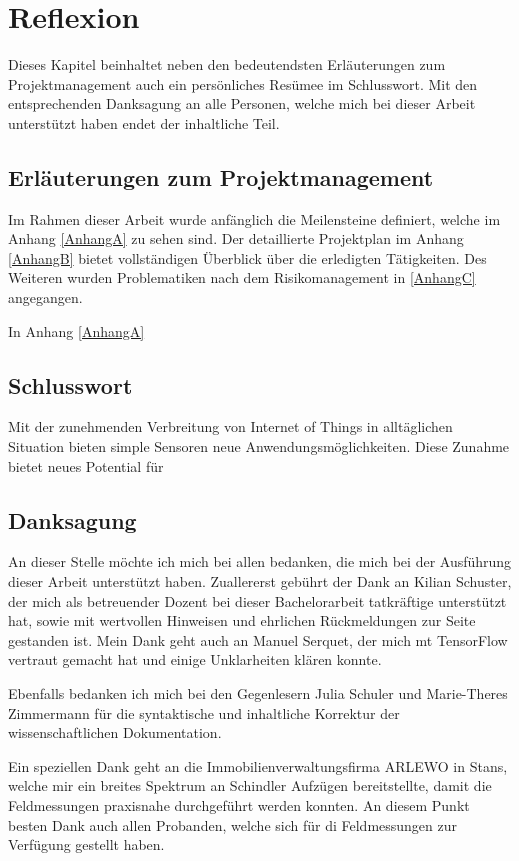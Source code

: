 \chapter{Reflexion}
\label{chap:Reflexion}

Dieses Kapitel beinhaltet neben den bedeutendsten Erläuterungen zum Projektmanagement auch ein persönliches Resümee im Schlusswort. Mit den entsprechenden Danksagung an alle Personen, welche mich bei dieser Arbeit unterstützt haben endet der inhaltliche Teil.


\section{Erläuterungen zum Projektmanagement}
Im Rahmen dieser Arbeit wurde anfänglich die Meilensteine definiert, welche im Anhang \ref{AnhangA} zu sehen sind. Der detaillierte Projektplan im Anhang \ref{AnhangB} bietet vollständigen Überblick über die erledigten Tätigkeiten. Des Weiteren wurden Problematiken nach dem Risikomanagement in \ref{AnhangC} angegangen.

In Anhang \ref{AnhangA}


\section{Schlusswort}

Mit der zunehmenden Verbreitung von Internet of Things in alltäglichen Situation bieten simple Sensoren neue Anwendungsmöglichkeiten. Diese Zunahme bietet neues Potential für 



\section{Danksagung}

An dieser Stelle möchte ich mich bei allen bedanken, die mich bei der Ausführung dieser
Arbeit unterstützt haben. 
Zuallererst gebührt der Dank an Kilian Schuster, der mich als betreuender Dozent bei dieser Bachelorarbeit tatkräftige unterstützt hat, sowie mit wertvollen Hinweisen und ehrlichen Rückmeldungen zur Seite gestanden ist. Mein Dank geht auch an Manuel Serquet, der mich mt TensorFlow vertraut gemacht hat und einige Unklarheiten klären konnte. 

Ebenfalls bedanken ich mich bei den Gegenlesern Julia Schuler und Marie-Theres Zimmermann für die syntaktische und inhaltliche Korrektur der wissenschaftlichen Dokumentation.

Ein speziellen Dank geht an die Immobilienverwaltungsfirma ARLEWO in Stans, welche mir ein breites Spektrum an Schindler Aufzügen bereitstellte, damit die Feldmessungen praxisnahe durchgeführt werden konnten. An diesem Punkt besten Dank auch allen Probanden, welche sich für di Feldmessungen zur Verfügung gestellt haben.